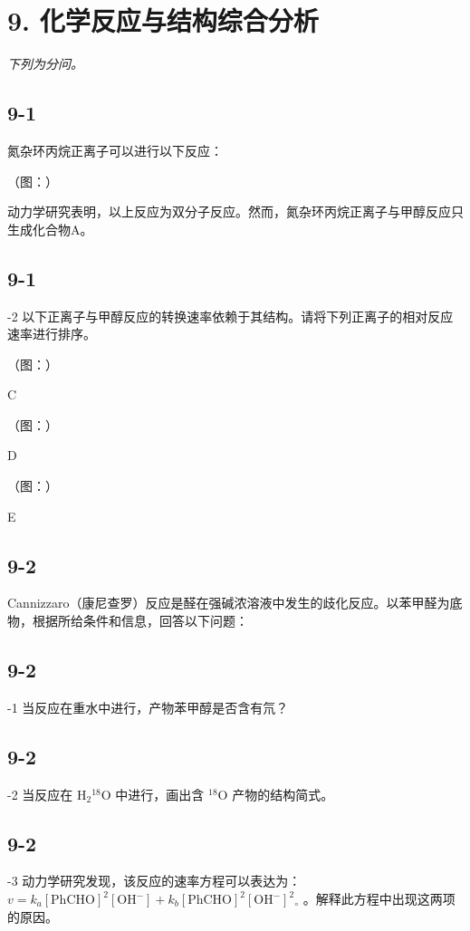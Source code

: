 \section*{9. 化学反应与结构综合分析}
\textit{下列为分问。}

\subsection*{9-1}
氮杂环丙烷正离⼦可以进⾏以下反应：

（图：）

动⼒学研究表明，以上反应为双分⼦反应。然⽽，氮杂环丙烷正离⼦与甲醇反应只⽣成化合物A。

\subsection*{9-1}
-2 以下正离⼦与甲醇反应的转换速率依赖于其结构。请将下列正离⼦的相对反应速率进⾏排序。

（图：）

C

（图：）

D

（图：）

E

\subsection*{9-2}
Cannizzaro（康尼查罗）反应是醛在强碱浓溶液中发⽣的歧化反应。以苯甲醛为底物，根据所给条件和信息，回答以下问题：

\subsection*{9-2}
-1 当反应在重⽔中进⾏，产物苯甲醇是否含有氘？

\subsection*{9-2}
-2 当反应在 $\mathrm { H } _ { 2 } { } ^ { 1 8 } \mathrm { O }$ 中进⾏，画出含 $^ { 1 8 } \mathrm { O }$ 产物的结构简式。

\subsection*{9-2}
-3 动⼒学研究发现，该反应的速率⽅程可以表达为： $v = k _ { a } [ \mathrm { P h C H O } ] ^ { 2 } [ \mathrm { O H ^ { - } } ] + k _ { b } [ \mathrm { P h C H O } ] ^ { 2 } [ \mathrm { O H ^ { - } } ] ^ { 2 } \mathrm { _ { \circ } }$ 。解释此⽅程中出现这两项的原因。
